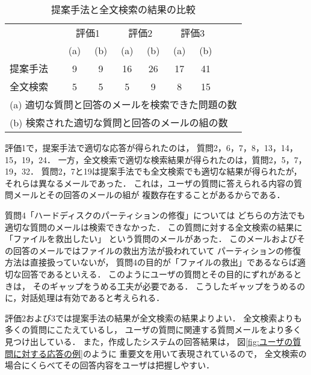 \begin{table}[t]
  \begin{center}
   \caption{提案手法と全文検索の結果の比較}
   \label{tab:提案手法と全文検索の結果の比較}

   \vspace{2mm}

   \begin{tabular}{lcccccccc}
    & \multicolumn{2}{c}{評価1} & \multicolumn{2}{c}{評価2} & \multicolumn{2}{c}{評価3} 
    & \multicolumn{2}{c}{} \\
             & (a) & (b) & (a) & (b) & (a) & (b) & & \\ \hline
    提案手法 &  9  &  9  &  16  & 26  & 17  & 41 & & \\ 
    全文検索 &  5  &  5  &  5  &  9  &  8  & 15  & & \\ \hline
    \multicolumn{9}{l}{\footnotesize (a) 適切な質問と回答のメールを検索できた問題の数} \\
    \multicolumn{9}{l}{\footnotesize (b) 検索された適切な質問と回答のメールの組の数} 
   \end{tabular}
  \end{center}
 \end{table}

 評価1で，提案手法で適切な応答が得られたのは，
 質問2，6，7，8，13，14，15，19，24．
 一方，全文検索で適切な検索結果が得られたのは，質問2，5，7，19，32．
 質問2，7と19は提案手法でも全文検索でも適切な結果が得られたが，
 それらは異なるメールであった．
 これは，ユーザの質問に答えられる内容の質問メールとその回答のメールの組が
 複数存在することがあるからである．

 質問4「ハードディスクのパーティションの修復」については
 どちらの方法でも適切な質問のメールは検索できなかった．
 この質問に対する全文検索の結果に「ファイルを救出したい」
 という質問のメールがあった．
 このメールおよびその回答のメールではファイルの救出方法が扱われていて
 パーティションの修復方法は直接扱っていないが，
 質問4の目的が「ファイルの救出」であるならば適切な回答であるといえる．
 このようにユーザの質問とその目的にずれがあるときは，
 そのギャップをうめる工夫が必要である．
 こうしたギャップをうめるのに，対話処理は有効であると考えられる．

 評価2および3では提案手法の結果が全文検索の結果よりよい．
 全文検索よりも多くの質問にこたえているし，
 ユーザの質問に関連する質問メールをより多く見つけ出している．
 また，作成したシステムの回答結果は，
 図\ref{fig:ユーザの質問に対する応答の例}のように
 重要文を用いて表現されているので， 
 全文検索の場合にくらべてその回答内容をユーザは把握しやすい．



